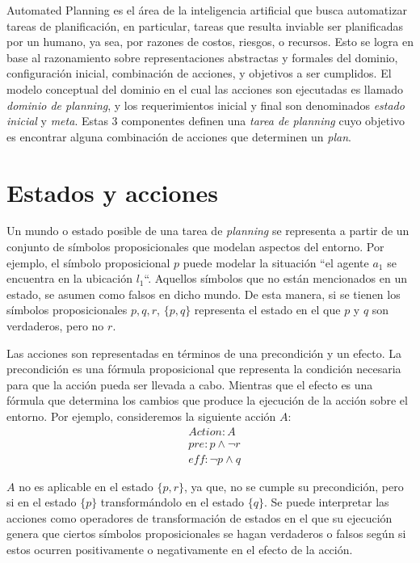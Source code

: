 Automated Planning es el área de la inteligencia artificial que busca
automatizar tareas de planificación, en particular, tareas que resulta inviable
ser planificadas por un humano, ya sea, por razones de costos, riesgos, o
recursos. Esto se logra en base al razonamiento sobre representaciones
abstractas y formales del dominio, configuración inicial, combinación de
acciones, y objetivos a ser cumplidos. El modelo conceptual del dominio en el
cual las acciones son ejecutadas es llamado \emph{dominio de planning}, y los
requerimientos inicial y final son denominados \emph{estado inicial} y
\emph{meta}. Estas 3 componentes definen una \emph{tarea de planning} cuyo
objetivo es encontrar alguna combinación de acciones que determinen un
\emph{plan}.

\section{Estados y acciones}

Un mundo o estado  posible de una tarea de \emph{planning} se representa a
partir de un conjunto de símbolos proposicionales que modelan aspectos del
entorno. Por ejemplo, el símbolo proposicional $p$ puede modelar la situación
``el agente $a_1$ se encuentra en la ubicación $l_1$``. Aquellos símbolos  que
no están mencionados en un estado, se asumen como falsos en dicho mundo. De
esta manera, si se tienen los símbolos proposicionales $p,q,r$, $\{p, q\}$
representa el estado en el que $p$ y $q$ son verdaderos, pero no $r$.

Las acciones son representadas en términos de una precondición y un efecto. La
precondición es una fórmula proposicional que representa la condición necesaria
para que la acción pueda ser llevada a cabo. Mientras que el efecto es una
fórmula que determina los cambios que produce la ejecución de la acción sobre el
entorno. Por ejemplo, consideremos la siguiente acción $A$:
\begin{align*}
    & Action : A \\
    & pre : p \land \neg r \\
    & \mathit{eff} : \neg p \land q
\end{align*}

$A$ no es aplicable en el estado $\{p, r\}$, ya que, no se cumple su
precondición, pero si en el estado $\{p\}$ transformándolo en el estado $\{q\}$.
Se puede interpretar las acciones como operadores de transformación de
estados en el que su ejecución genera que ciertos símbolos proposicionales
se hagan verdaderos o falsos según si estos ocurren positivamente o negativamente en el
efecto de la acción.

